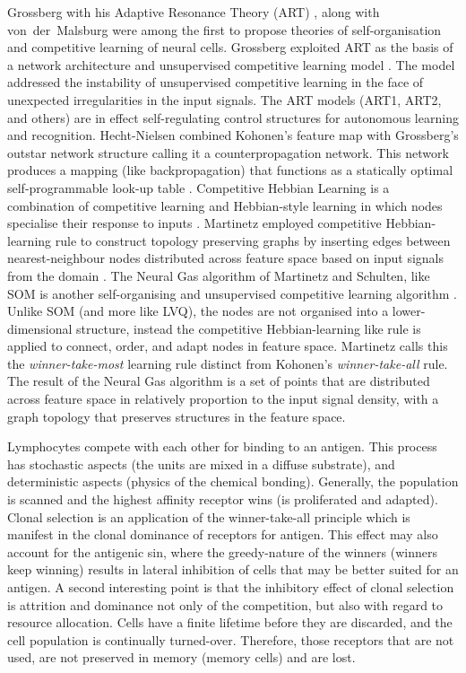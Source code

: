 Grossberg with his Adaptive Resonance Theory (ART) \cite{Grossberg1976a, Grossberg1972, Grossberg1976}, along with von~der~Malsburg \cite{Malsburg1973} were among the first to propose theories of self-organisation and competitive learning of neural cells. Grossberg exploited ART as the basis of a network architecture and unsupervised competitive learning model \cite{Carpenter1988, Grossberg1988}. The model addressed the instability of unsupervised competitive learning in the face of unexpected irregularities in the input signals. The ART models (ART1, ART2, and others) are in effect self-regulating control structures for autonomous learning and recognition. Hecht-Nielsen combined Kohonen's feature map with Grossberg's outstar network structure calling it a counterpropagation network. This network produces a mapping (like backpropagation) that functions as a statically optimal self-programmable look-up table \cite{Hecht-Nielsen1987, Hecht-Nielsen1987a}. Competitive Hebbian Learning is a combination of competitive learning and Hebbian-style learning in which nodes specialise their response to inputs \cite{White1991, White1992, White1992a}. Martinetz employed competitive Hebbian-learning rule to construct topology preserving graphs by inserting edges between nearest-neighbour nodes distributed across feature space based on input signals from the domain \cite{Martinetz1993}. The Neural Gas algorithm of Martinetz and Schulten, like SOM is another self-organising and unsupervised competitive learning algorithm \cite{Martinetz1993a, Martinetz1991, Martinetz1994}. Unlike SOM (and more like LVQ), the nodes are not organised into a lower-dimensional structure, instead the competitive Hebbian-learning like rule is applied to connect, order, and adapt nodes in feature space. Martinetz calls this the \emph{winner-take-most} learning rule distinct from Kohonen's \emph{winner-take-all} rule. The result of the Neural Gas algorithm is a set of points that are distributed across feature space in relatively proportion to the input signal density, with a graph topology that preserves structures in the feature space. 

Lymphocytes compete with each other for binding to an antigen. This process has stochastic aspects (the units are mixed in a diffuse substrate), and deterministic aspects (physics of the chemical bonding). Generally, the population is scanned and the highest affinity receptor wins (is proliferated and adapted). Clonal selection is an application of the winner-take-all principle which is manifest in the clonal dominance of receptors for antigen. This effect may also account for the antigenic sin, where the greedy-nature of the winners (winners keep winning) results in lateral inhibition of cells that may be better suited for an antigen. A second interesting point is that the inhibitory effect of clonal selection is attrition and dominance not only of the competition, but also with regard to resource allocation. Cells have a finite lifetime before they are discarded, and the cell population is continually turned-over. Therefore, those receptors that are not used, are not preserved in memory (memory cells) and are lost. 

